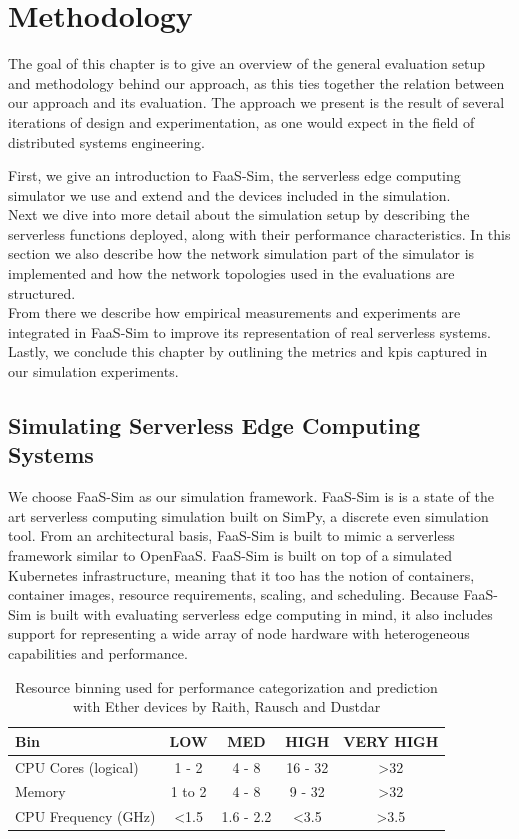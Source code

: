 \documentclass[draft,final]{vutinfth} %
\begin{document}
\chapter{Methodology}
The goal of this chapter is to give an overview of the general evaluation setup and methodology behind our approach, as this ties together the relation between our approach and its evaluation.
The approach we present is the result of several iterations of design and experimentation, as one would expect in the field of distributed systems engineering.

First, we give an introduction to FaaS-Sim, the serverless edge computing simulator we use and extend and the devices included in the simulation.\\
Next we dive into more detail about the simulation setup by describing the serverless functions deployed, along with their performance characteristics.
In this section we also describe how the network simulation part of the simulator is implemented and how the network topologies used in the evaluations are structured.\\
From there we describe how empirical measurements and experiments are integrated in FaaS-Sim to improve its representation of real serverless systems.\\
Lastly, we conclude this chapter by outlining the metrics and \glspl{kpi} captured in our simulation experiments.

\section{Simulating Serverless Edge Computing Systems}
We choose FaaS-Sim\cite{faas-sim-github} as our simulation framework.
FaaS-Sim is is a state of the art serverless computing simulation built on SimPy, %
a discrete even simulation tool.
From an architectural basis, FaaS-Sim is built to mimic a serverless framework similar to OpenFaaS.
FaaS-Sim is built on top of a simulated Kubernetes infrastructure, meaning that it too has the notion of containers, container images, resource requirements, scaling, and scheduling.
Because FaaS-Sim is built with evaluating serverless edge computing in mind, it also includes support for representing a wide array of node hardware with heterogeneous capabilities and performance.
\begin{table}[]
\begin{tabular}{lcccc}
\hline
\textbf{Bin}        & \textbf{LOW}  & \textbf{MED} & \textbf{HIGH} & \textbf{VERY HIGH} \\ \hline
CPU Cores (logical) & 1 - 2         & 4 - 8        & 16 - 32       & \textgreater 32    \\
Memory              & 1 to 2        & 4 - 8        & 9 - 32        & \textgreater 32    \\
CPU Frequency (GHz) & \textless 1.5 & 1.6 - 2.2    & \textless 3.5 & \textgreater 3.5   \\ \hline
\end{tabular}
\caption{Resource binning used for performance categorization and prediction with Ether devices by Raith, Rausch and Dustdar\cite{philipp-da}}
\label{tab:ether_bins}
\end{table}
\end{document}

